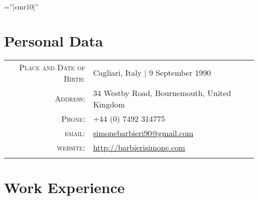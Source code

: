 \documentclass[a4paper,10pt]{article} %
\begin{document}
\pagestyle{empty} %

\font\fb=''[cmr10]'' %


\par{\bigskip\par} %

\section{Personal Data}

\begin{tabular}{rl}
\textsc{Place and Date of Birth:} & Cagliari, Italy  | 9 September 1990 \\
\textsc{Address:} & 34 Westby Road, Bournemouth, United Kingdom \\
\textsc{Phone:} & +44 (0) 7492 314775\\
\textsc{email:} & \href{mailto:simonebarbieri90@gmail.com}{simonebarbieri90@gmail.com} \\
\textsc{website:} & \href{http://barbierisimone.com}{http://barbierisimone.com}\\
&\\
\end{tabular}


\section{Work Experience}
\end{document}
